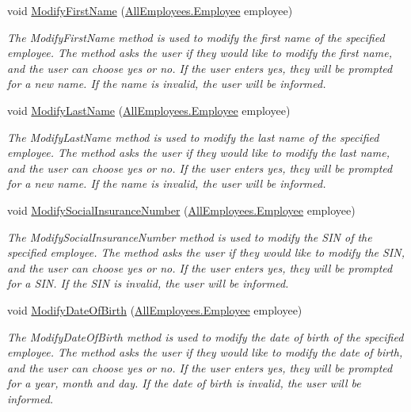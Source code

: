 \begin{DoxyCompactItemize}
void \hyperlink{class_the_company_1_1_container_a4a7d1fc143b5508d5d75bf3f273efcc2}{Modify\+First\+Name} (\hyperlink{class_all_employees_1_1_employee}{All\+Employees.\+Employee} employee)
\begin{DoxyCompactList}\small\item\em The Modify\+First\+Name method is used to modify the first name of the specified employee. The method asks the user if they would like to modify the first name, and the user can choose yes or no. If the user enters yes, they will be prompted for a new name. If the name is invalid, the user will be informed. \end{DoxyCompactList}\item 
void \hyperlink{class_the_company_1_1_container_a2e47d1205452ecb352ea6609e0cddcc5}{Modify\+Last\+Name} (\hyperlink{class_all_employees_1_1_employee}{All\+Employees.\+Employee} employee)
\begin{DoxyCompactList}\small\item\em The Modify\+Last\+Name method is used to modify the last name of the specified employee. The method asks the user if they would like to modify the last name, and the user can choose yes or no. If the user enters yes, they will be prompted for a new name. If the name is invalid, the user will be informed. \end{DoxyCompactList}\item 
void \hyperlink{class_the_company_1_1_container_ac58d486919a05c5940937c8b3e29cb38}{Modify\+Social\+Insurance\+Number} (\hyperlink{class_all_employees_1_1_employee}{All\+Employees.\+Employee} employee)
\begin{DoxyCompactList}\small\item\em The Modify\+Social\+Insurance\+Number method is used to modify the S\+I\+N of the specified employee. The method asks the user if they would like to modify the S\+I\+N, and the user can choose yes or no. If the user enters yes, they will be prompted for a S\+I\+N. If the S\+I\+N is invalid, the user will be informed. \end{DoxyCompactList}\item 
void \hyperlink{class_the_company_1_1_container_ab031c4984b46f0bf58388860dd2a8d7a}{Modify\+Date\+Of\+Birth} (\hyperlink{class_all_employees_1_1_employee}{All\+Employees.\+Employee} employee)
\begin{DoxyCompactList}\small\item\em The Modify\+Date\+Of\+Birth method is used to modify the date of birth of the specified employee. The method asks the user if they would like to modify the date of birth, and the user can choose yes or no. If the user enters yes, they will be prompted for a year, month and day. If the date of birth is invalid, the user will be informed. \end{DoxyCompactList}\item 

\end{DoxyCompactItemize}
